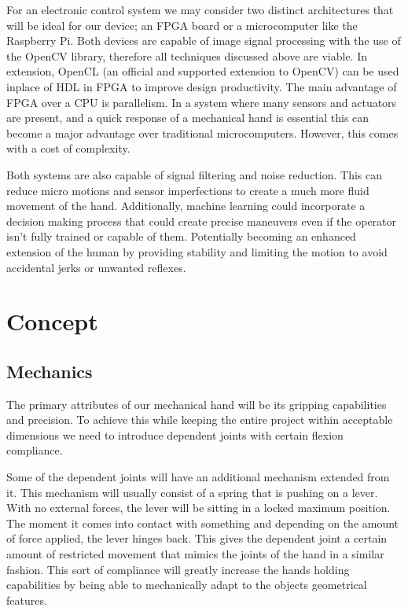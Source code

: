 \documentclass{article}
\begin{document}
For an electronic control system we may consider two distinct architectures that will be ideal for our device; an FPGA board or a microcomputer like the Raspberry Pi. Both devices are capable of image signal processing with the use of the OpenCV library, therefore all techniques discussed above are viable. In extension, OpenCL (an official and supported extension to OpenCV) can be used inplace of HDL in FPGA to improve design productivity. The main advantage of FPGA over a CPU is parallelism\cite{FPGA}. In a system where many sensors and actuators are present, and a quick response of a mechanical hand is essential this can become a major advantage over traditional microcomputers. However, this comes with a cost of complexity.

Both systems are also capable of signal filtering and noise reduction. This can reduce micro motions and sensor imperfections to create a much more fluid movement of the hand. Additionally, machine learning could incorporate a decision making process that could create precise maneuvers even if the operator isn't fully trained or capable of them.  Potentially becoming an enhanced extension of the human by providing stability and limiting the motion to avoid accidental jerks or unwanted reflexes.

\section{Concept}
\subsection{Mechanics}

The primary attributes of our mechanical hand will be its gripping capabilities and precision. To achieve this while keeping the entire project within acceptable dimensions we need to introduce dependent joints with certain flexion compliance.

Some of the dependent joints will have an additional mechanism extended from it. This mechanism will usually consist of a spring that is pushing on a lever. With no external forces, the lever will be sitting in a locked maximum position. The moment it comes into contact with something and depending on the amount of force applied, the lever hinges back. This gives the dependent joint a certain amount of restricted movement that mimics the joints of the hand in a similar fashion. This sort of compliance will greatly increase the hands holding capabilities by being able to mechanically adapt to the objects geometrical features.
\end{document}
